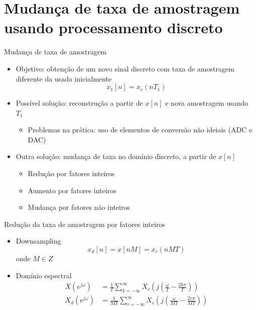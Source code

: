 \documentclass[
size=11pt,
paper=screen,
mode=present,
display=slidesnotes,
style=paintings,
nopagebreaks,
blackslide,
fleqn]{powerdot}
\begin{document}
\section{Mudança de taxa de amostragem usando processamento discreto}
\begin{slide}{Mudança de taxa de amostragem}
	\begin{itemize}
		\item Objetivo: obtenção de um novo sinal discreto com taxa de amostragem diferente da usada inicialmente
			\begin{equation*}
				x_1[n] = x_c(nT_1)
			\end{equation*}
		\item Possível solução: reconstrução a partir de $x[n]$ e nova amostragem usando $T_1$
		\begin{itemize}
			\item Problemas na prática: uso de elementos  de conversão não ideiais (ADC e DAC)
		\end{itemize}
		\item Outra solução: mudança de taxa no domínio discreto, a partir de $x[n]$
		\begin{itemize}
			\item Redução por fatores inteiros
			\item Aumento por fatores inteiros
			\item Mudança por fatores não inteiros
		\end{itemize}
	\end{itemize}
\end{slide}

\begin{slide}{Redução da taxa de amostragem por fatores inteiros}
	\begin{itemize}
		\item Downsampling
			\begin{equation*}
				x_d[n] = x[nM] = x_c(nMT)
			\end{equation*}
			onde $M \in Z$
		\item Domínio espectral
			\begin{align*}
     				X(e^{j\omega})& = \frac{1}{T}\sum_{k=-\infty}^{\infty}X_c\left(j\left(\frac{\omega}{T}-\frac{2k\pi}{T}\right )\right )\\
				X_d(e^{j\omega})& = \frac{1}{MT}\sum_{r=-\infty}^{\infty}X_c\left(j\left(\frac{\omega}{MT}-\frac{2r\pi}{MT}\right )\right )
			\end{align*}
	\end{itemize}
\end{slide}
\end{document}
